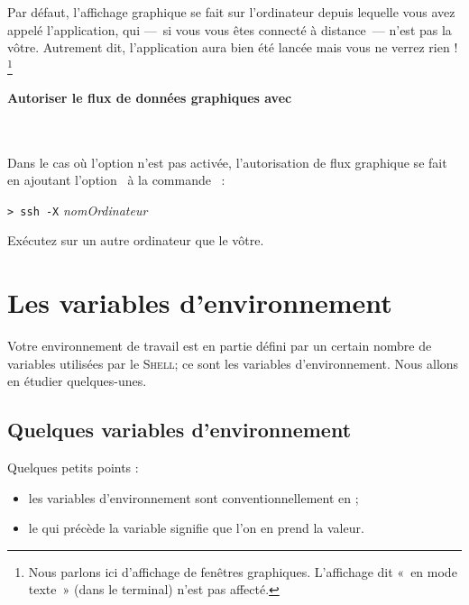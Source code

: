 \documentclass[11pt,a4paper]{article}
\newcommand{\shell}{\textsc{Shell}}
\begin{document}
Par défaut, l'affichage graphique se fait sur l'ordinateur depuis
lequelle vous avez appelé l'application, qui ---~si vous vous êtes
connecté à distance~--- n'est pas la vôtre. Autrement dit,
l'application aura bien été lancée mais vous ne verrez rien !%
\footnote{Nous parlons ici d'affichage de fenêtres graphiques.
L'affichage dit «~en mode texte~» (dans le terminal) n'est pas
affecté.}

\begin{comment}
Les flux de données graphiques ne sont pas, par défaut,
automatiquement transmis à travers la connexion à l'ordinateur
distante. Il faut explicitement l'autoriser.
\end{comment}

\paragraph{Autoriser le flux de données graphiques avec }

\

Dans le cas où l'option n'est pas activée, l'autorisation de flux graphique
se fait en ajoutant l'option~ à la commande ~:

\noindent \verb+> ssh -X+ {\em nomOrdinateur}

% 
\begin{maw}
 Exécutez  sur un autre ordinateur que le vôtre.
\end{maw}


\section{Les variables d'environnement}

Votre environnement de travail est en partie défini par un
certain nombre de variables utilisées par le \shell ; ce
sont les variables d'environnement. Nous allons en étudier
quelques-unes.

\subsection{Quelques variables d'environnement}

Quelques petits points :
\begin{itemize}
 \item les variables d'environnement sont conventionnellement en
        ;
 \item le \cmd{\$} qui précède la variable signifie que l'on
       en prend la valeur.
\end{itemize}
\end{document}

